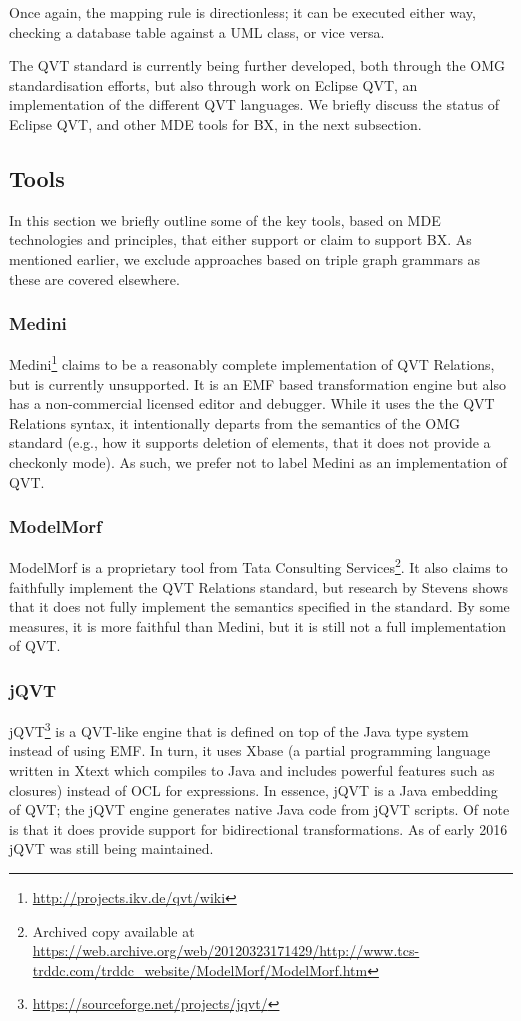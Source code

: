 Once again, the mapping rule is directionless; it can be executed either way, checking a database table against a UML class, or vice versa.

The QVT standard is currently being further developed, both through the OMG standardisation efforts, but also through work on Eclipse QVT, an implementation of the different QVT languages. We briefly discuss the status of Eclipse QVT, and other MDE tools for BX, in the next subsection.

\subsection{Tools}
In this section we briefly outline some of the key tools, based on MDE technologies and principles, that either support or claim to support BX. As mentioned earlier, we exclude approaches based on triple graph grammars as these are covered elsewhere.

\subsubsection{Medini}
Medini\footnote{\url{http://projects.ikv.de/qvt/wiki}} claims to be a reasonably complete implementation of QVT Relations, but is currently unsupported. It is an EMF based transformation engine but also has a non-commercial licensed editor and debugger. While it uses the the QVT Relations syntax, it intentionally departs from the semantics of the OMG standard (e.g., how it supports deletion of elements, that it does not provide a checkonly mode). As such, we prefer not to label Medini as an implementation of QVT.

\subsubsection{ModelMorf}
ModelMorf is a proprietary tool from Tata Consulting Services\footnote{Archived copy available at \url{https://web.archive.org/web/20120323171429/http://www.tcs-trddc.com/trddc_website/ModelMorf/ModelMorf.htm}}. It also claims to faithfully implement the QVT Relations standard, but research by Stevens \cite{stevens11} shows that it does not fully implement the semantics specified in the standard. By some measures, it is more faithful than Medini, but it is still not a full implementation of QVT.

\subsubsection{jQVT}
jQVT\footnote{\url{https://sourceforge.net/projects/jqvt/}} is a QVT-like engine that is defined on top of the Java type system instead of using EMF. In turn, it uses Xbase (a partial programming language written in Xtext which compiles to Java and includes powerful features such as closures) instead of OCL for expressions. In essence, jQVT is a Java embedding of QVT; the jQVT engine generates native Java code from jQVT scripts. Of note is that it does provide support for bidirectional transformations. As of early 2016 jQVT was still being maintained.

